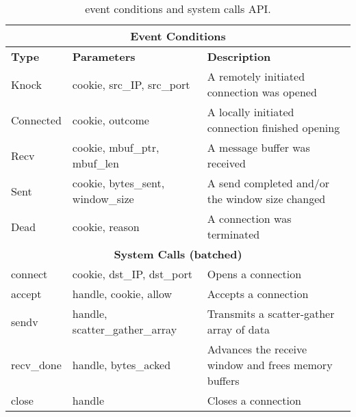 \begin{table*}[t]
\centering
\begin{small}
\begin{tabular}{|l|l|l|}
\hline
\multicolumn{3}{|c|}{{\bf Event Conditions}} \\
\hline
{\bf Type} &           {\bf Parameters}  &
{\bf Description}\\
\hline
Knock  &               cookie, src\_IP, src\_port		& A remotely initiated connection was opened \\
Connected &            cookie, outcome				& A locally initiated connection finished opening \\
Recv &                 cookie, mbuf\_ptr, mbuf\_len		& A message buffer was received \\
Sent &                 cookie, bytes\_sent, window\_size	& A send completed and/or the window size changed \\
Dead &                 cookie, reason				& A connection was terminated \\
\hline
\hline
\multicolumn{3}{|c|}{{\bf System Calls (batched)}} \\
\hline
connect &             cookie, dst\_IP, dst\_port		& Opens a connection\\
accept &              handle, cookie, allow			& Accepts a connection\\
sendv &               handle, scatter\_gather\_array		& Transmits a scatter-gather array of data\\
recv\_done &          handle, bytes\_acked			& Advances the receive window and frees memory buffers\\
close &               handle					& Closes a connection\\
\hline
\end{tabular}
\caption{\ix event conditions and system calls API.}
\label{tbl:api}
\end{small}
\end{table*}


